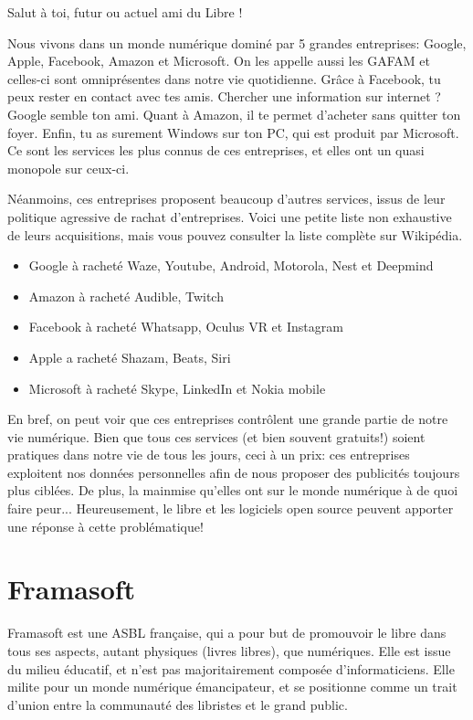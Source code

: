\documentclass[12pt]{../fiche}
\begin{document}
	
	
	\vspace{0.8em}
	
	Salut à toi, futur ou actuel ami du Libre ! 
	
	\vspace{0.8em}
	
Nous vivons dans un monde numérique dominé par 5 grandes entreprises: Google, Apple, Facebook, Amazon et Microsoft. On les appelle aussi les GAFAM et celles-ci sont omniprésentes dans notre vie quotidienne. Grâce à Facebook, tu peux rester en contact avec tes amis. Chercher une information sur internet ? Google semble ton ami. Quant à Amazon, il te permet d'acheter sans quitter ton foyer. Enfin, tu as surement Windows sur ton PC, qui est produit par Microsoft. Ce sont les services les plus connus de ces entreprises, et elles ont un quasi monopole sur ceux-ci. 

Néanmoins, ces entreprises proposent beaucoup d'autres services, issus de leur politique agressive de rachat d'entreprises. Voici une petite liste non exhaustive de leurs acquisitions, mais vous pouvez consulter la liste complète sur Wikipédia.
\begin{itemize}
	\item Google à racheté Waze, Youtube, Android, Motorola, Nest et Deepmind
	\item Amazon à racheté Audible, Twitch
	\item Facebook à racheté Whatsapp, Oculus VR et Instagram
	\item Apple a racheté Shazam, Beats, Siri
	\item Microsoft à racheté Skype, LinkedIn et Nokia mobile
	
\end{itemize}

En bref, on peut voir que ces entreprises contrôlent une grande partie de notre vie numérique. Bien que tous ces services (et bien souvent gratuits!) soient pratiques dans notre vie de tous les jours, ceci à un prix: ces entreprises exploitent nos données personnelles afin de nous proposer des publicités toujours plus ciblées. De plus, la mainmise qu'elles ont sur le monde numérique à de quoi faire peur... Heureusement, le libre et les logiciels open source peuvent apporter une réponse à cette problématique!




	\section*{Framasoft}
	Framasoft est une ASBL française, qui a pour but de promouvoir le libre dans tous ses aspects, autant physiques (livres libres), que numériques. Elle est issue du milieu éducatif, et n'est pas majoritairement composée d'informaticiens. Elle milite pour un monde numérique émancipateur, et se positionne comme un trait d'union entre la communauté des libristes et le grand public.
	
\end{document}
